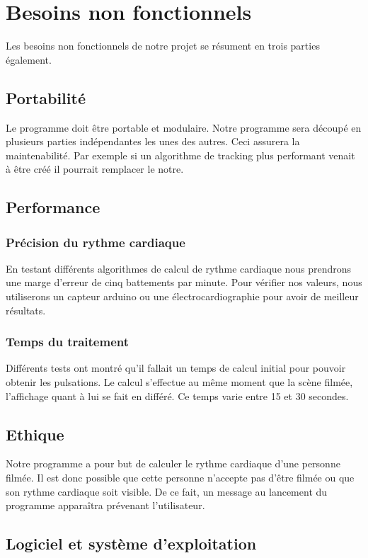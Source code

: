 \documentclass[12pt,a4paper]{article}
\begin{document}
\section{Besoins non fonctionnels}

Les besoins non fonctionnels de notre projet se résument en trois parties également.
\subsection{Portabilité}
Le programme doit être portable et modulaire. Notre programme sera découpé en plusieurs parties indépendantes les unes des autres. Ceci assurera la maintenabilité. Par exemple si un algorithme de tracking plus performant venait à être créé il pourrait remplacer le notre.

\subsection{Performance}

\subsubsection{Précision du rythme cardiaque}

En testant différents algorithmes de calcul de rythme cardiaque nous prendrons une marge d'erreur de cinq battements par minute. Pour vérifier nos valeurs, nous utiliserons un capteur arduino ou une électrocardiographie pour avoir de meilleur résultats.
\subsubsection{Temps du traitement}

Différents tests ont montré qu'il fallait un temps de calcul initial pour pouvoir obtenir les pulsations. Le calcul s'effectue au même moment que la scène filmée, l'affichage quant à lui se fait en différé. Ce temps varie entre 15 et 30 secondes.

\subsection{Ethique}

Notre programme a pour but de calculer le rythme cardiaque d'une personne filmée. Il est donc possible que cette personne n'accepte pas d'être filmée ou que son rythme cardiaque soit visible. De ce fait, un message au lancement du programme apparaîtra prévenant l'utilisateur.
\newpage
\subsection{Logiciel et système d'exploitation}
\end{document}
